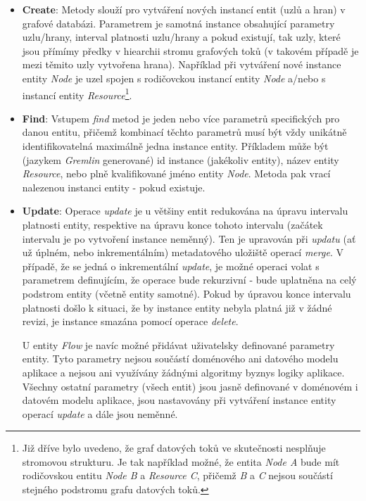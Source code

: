 \begin{itemize}
   \item{\textbf{Create}}: Metody slouží pro vytváření nových instancí entit (uzlů a hran) v grafové databázi. Parametrem je samotná instance obsahující parametry uzlu/hrany, interval platnosti uzlu/hrany a pokud existují, tak uzly, které jsou přímímy předky v hiearchii stromu grafových toků (v takovém případě je mezi těmito uzly vytvořena hrana). Například při vytváření nové instance entity \textit{Node} je uzel spojen s rodičovckou instancí entity \textit{Node} a/nebo s instancí entity \textit{Resource}\footnote{Již dříve bylo uvedeno, že graf datových toků ve skutečnosti nesplňuje stromovou strukturu. Je tak například možné, že entita \textit{Node A} bude mít rodičovskou entitu \textit{Node B} a \textit{Resource C}, přičemž \textit{B} a \textit{C} nejsou součástí stejného podstromu grafu datových toků.}.

   \item{\textbf{Find}}: Vstupem \textit{find} metod je jeden nebo více parametrů specifických pro danou entitu, přičemž kombinací těchto parametrů musí být vždy unikátně identifikovatelná maximálně jedna instance entity. Příkladem může být (jazykem \textit{Gremlin} generované) id instance (jakékoliv entity), název entity \textit{Resource}, nebo plně kvalifikované jméno entity \textit{Node}. Metoda pak vrací nalezenou instanci entity - pokud existuje.

   \item{\textbf{Update}}: Operace \textit{update} je u většiny entit redukována na úpravu intervalu platnosti entity, respektive na úpravu konce tohoto intervalu (začátek intervalu je po vytvoření instance neměnný). Ten je upravován při \textit{updatu} (ať už úplném, nebo inkrementálním) metadatového uložiště operací \textit{merge}. V případě, že se jedná o inkrementální \textit{update}, je možné operaci volat s parametrem definujícím, že operace bude rekurzivní - bude uplatněna na celý podstrom entity (včetně entity samotné). Pokud by úpravou konce intervalu platnosti došlo k situaci, že by instance entity nebyla platná již v žádné revizi, je instance smazána pomocí operace \textit{delete}.

    U entity \textit{Flow} je navíc možné přidávat uživatelsky definované parametry entity. Tyto parametry nejsou součástí doménového ani datového modelu aplikace a nejsou ani využívány žádnými algoritmy byznys logiky aplikace. Všechny ostatní parametry (všech entit) jsou jasně definované v doménovém i datovém modelu aplikace, jsou nastavovány při vytváření instance entity operací \textit{update} a dále jsou neměnné.


\end{itemize}
